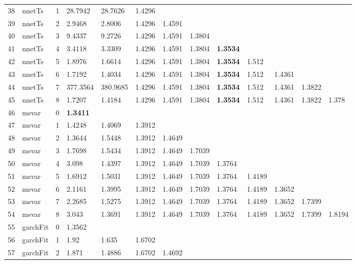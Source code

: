 \documentclass[10pt,a4paper]{article}
\begin{document}
\begin{table}[ht]
\begin{tabular}{rlrllllllllll}
  38 & nnetTs &     1 & 28.7942 & 28.7626 & 1.4296 &  &  &  &  &  &  &  \\ 
  39 & nnetTs &     2 & 2.9468 & 2.8006 & 1.4296 & 1.4591 &  &  &  &  &  &  \\ 
  40 & nnetTs &     3 & 9.4337 & 9.2726 & 1.4296 & 1.4591 & 1.3804 &  &  &  &  &  \\ 
  41 & nnetTs &     4 & 3.4118 & 3.3309 & 1.4296 & 1.4591 & 1.3804 & \textbf{1.3534} &  &  &  &  \\ 
  42 & nnetTs &     5 & 1.8976 & 1.6614 & 1.4296 & 1.4591 & 1.3804 & \textbf{1.3534} & 1.512 &  &  &  \\ 
  43 & nnetTs &     6 & 1.7192 & 1.4034 & 1.4296 & 1.4591 & 1.3804 & \textbf{1.3534} & 1.512 & 1.4361 &  &  \\ 
  44 & nnetTs &     7 & 377.3564 & 380.9685 & 1.4296 & 1.4591 & 1.3804 & \textbf{1.3534} & 1.512 & 1.4361 & 1.3822 &  \\ 
  45 & nnetTs &     8 & 1.7207 & 1.4184 & 1.4296 & 1.4591 & 1.3804 & \textbf{1.3534} & 1.512 & 1.4361 & 1.3822 & 1.378 \\ 
   \hline
46 & msvar &     0 & \textbf{1.3411} &  &  &  &  &  &  &  &  &  \\ 
  47 & msvar &     1 & 1.4248 & 1.4069 & 1.3912 &  &  &  &  &  &  &  \\ 
  48 & msvar &     2 & 1.3644 & 1.5448 & 1.3912 & 1.4649 &  &  &  &  &  &  \\ 
  49 & msvar &     3 & 1.7698 & 1.5434 & 1.3912 & 1.4649 & 1.7039 &  &  &  &  &  \\ 
  50 & msvar &     4 & 3.098 & 1.4397 & 1.3912 & 1.4649 & 1.7039 & 1.3764 &  &  &  &  \\ 
  51 & msvar &     5 & 1.6912 & 1.5031 & 1.3912 & 1.4649 & 1.7039 & 1.3764 & 1.4189 &  &  &  \\ 
  52 & msvar &     6 & 2.1161 & 1.3995 & 1.3912 & 1.4649 & 1.7039 & 1.3764 & 1.4189 & 1.3652 &  &  \\ 
  53 & msvar &     7 & 2.2685 & 1.5275 & 1.3912 & 1.4649 & 1.7039 & 1.3764 & 1.4189 & 1.3652 & 1.7399 &  \\ 
  54 & msvar &     8 & 3.043 & 1.3691 & 1.3912 & 1.4649 & 1.7039 & 1.3764 & 1.4189 & 1.3652 & 1.7399 & 1.8194 \\ 
   \hline
55 & garchFit &     0 & 1.3562 &  &  &  &  &  &  &  &  &  \\ 
  56 & garchFit &     1 & 1.92 & 1.635 & 1.6702 &  &  &  &  &  &  &  \\ 
  57 & garchFit &     2 & 1.871 & 1.4886 & 1.6702 & 1.4692 &  &  &  &  &  &  \\ 

\end{tabular}
\end{table}
\end{document}
